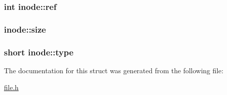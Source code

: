 \subsubsection[{\texorpdfstring{ref}{ref}}]{\setlength{\rightskip}{0pt plus 5cm}int inode\+::ref}\hypertarget{structinode_a6a519028ee67f805482b3e1725bf09c5}{}\label{structinode_a6a519028ee67f805482b3e1725bf09c5}
\subsubsection[{\texorpdfstring{size}{size}}]{ inode\+::size}\hypertarget{structinode_a918af769c48a8ca8afac057bf83d12de}{}\label{structinode_a918af769c48a8ca8afac057bf83d12de}
\subsubsection[{\texorpdfstring{type}{type}}]{\setlength{\rightskip}{0pt plus 5cm}short inode\+::type}\hypertarget{structinode_a8d74bec2898785c057111c328d23fda2}{}\label{structinode_a8d74bec2898785c057111c328d23fda2}


The documentation for this struct was generated from the following file\+:\begin{DoxyCompactItemize}
\item 
\hyperlink{file_8h}{file.\+h}\end{DoxyCompactItemize}
